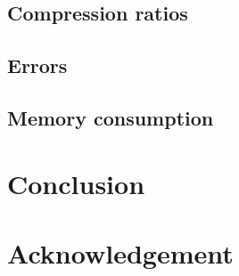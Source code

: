 \documentclass[10pt, conference, compsocconf]{IEEEtran}
\begin{document}
\subsection{Compression ratios}

\subsection{Errors}

\subsection{Memory consumption}

\section{Conclusion}

\section*{Acknowledgement}




\end{document}
